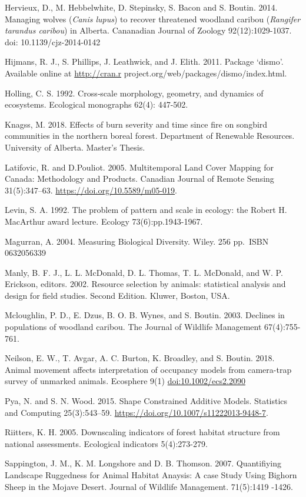 \documentclass[]{article}
\begin{document}
Hervieux, D., M. Hebbelwhite, D. Stepinsky, S. Bacon and S. Boutin.
2014. Managing wolves (\emph{Canis lupus}) to recover threatened
woodland caribou (\emph{Rangifer tarandus caribou}) in Alberta.
Cananadian Journal of Zoology 92(12):1029-1037. doi:
10.1139/cjz-2014-0142

Hijmans, R. J., S. Phillips, J. Leathwick, and J. Elith. 2011. Package
`dismo'. Available online at \url{http://cran.r}
project.org/web/packages/dismo/index.html.

Holling, C. S. 1992. Cross‐scale morphology, geometry, and dynamics of
ecosystems. Ecological monographs 62(4): 447-502.

Knagss, M. 2018. Effects of burn severity and time since fire on
songbird communities in the northern boreal forest. Department of
Renewable Resources. University of Alberta. Master's Thesis.

Latifovic, R. and D.Pouliot. 2005. Multitemporal Land Cover Mapping for
Canada: Methodology and Products. Canadian Journal of Remote Sensing
31(5):347--63. \url{https://doi.org/10.5589/m05-019}.

Levin, S. A. 1992. The problem of pattern and scale in ecology: the
Robert H. MacArthur award lecture. Ecology 73(6):pp.1943-1967.

Magurran, A. 2004. Measuring Biological Diversity. Wiley. 256 pp.~ISBN
0632056339

Manly, B. F. J., L. L. McDonald, D. L. Thomas, T. L. McDonald, and W. P.
Erickson, editors. 2002. Resource selection by animals: statistical
analysis and design for field studies. Second Edition. Kluwer, Boston,
USA.

Mcloughlin, P. D., E. Dzus, B. O. B. Wynes, and S. Boutin. 2003.
Declines in populations of woodland caribou. The Journal of Wildlife
Management 67(4):755-761.

Neilson, E. W., T. Avgar, A. C. Burton, K. Broadley, and S. Boutin.
2018. Animal movement affects interpretation of occupancy models from
camera-trap survey of unmarked animals. Ecosphere 9(1)
\url{doi:10.1002/ecs2.2090}

Pya, N. and S. N. Wood. 2015. Shape Constrained Additive Models.
Statistics and Computing 25(3):543--59.
\url{https://doi.org/10.1007/s11222013-9448-7}.

Riitters, K. H. 2005. Downscaling indicators of forest habitat structure
from national assessments. Ecological indicators 5(4):273-279.

Sappington, J. M., K. M. Longshore and D. B. Thomson. 2007. Quantifiying
Landscape Ruggedness for Animal Habitat Anaysis: A case Study Using
Bighorn Sheep in the Mojave Desert. Journal of Wildlife Management.
71(5):1419 -1426.
\end{document}
